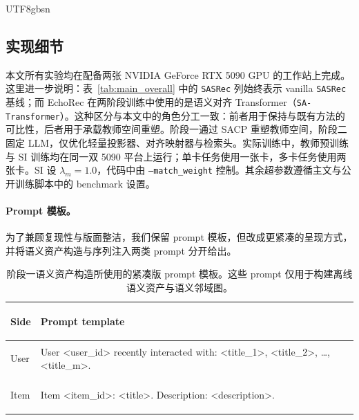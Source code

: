 \documentclass{article}
\begin{document}
\begin{CJK*}{UTF8}{gbsn}
\subsection{实现细节}
\label{app:implementation}

本文所有实验均在配备两张 NVIDIA GeForce RTX 5090 GPU 的工作站上完成。这里进一步说明：表~\ref{tab:main_overall} 中的 \texttt{SASRec} 列始终表示 vanilla \texttt{SASRec} 基线；而 EchoRec 在两阶段训练中使用的是语义对齐 Transformer（\texttt{SA-Transformer}）。这种区分与本文中的角色分工一致：前者用于保持与既有方法的可比性，后者用于承载教师空间重塑。阶段一通过 SACP 重塑教师空间，阶段二固定 LLM，仅优化轻量投影器、对齐映射器与检索头。实际训练中，教师预训练与 SI 训练均在同一双 5090 平台上运行；单卡任务使用一张卡，多卡任务使用两张卡。SI 设 $\lambda_m=1.0$，代码中由 \texttt{--match\_weight} 控制。其余超参数遵循主文与公开训练脚本中的 benchmark 设置。

\paragraph{Prompt 模板。}
为了兼顾复现性与版面整洁，我们保留 prompt 模板，但改成更紧凑的呈现方式，并将语义资产构造与序列注入两类 prompt 分开给出。

\begin{table}[t]
\centering
\caption{阶段一语义资产构造所使用的紧凑版 prompt 模板。这些 prompt 仅用于构建离线语义资产与语义邻域图。}
\label{tab:semantic_asset_prompt_template}
\small
\setlength{\tabcolsep}{6pt}
\renewcommand{\arraystretch}{1.16}
\begin{tabularx}{\textwidth}{>{\bfseries\raggedright\arraybackslash}p{1.15cm} >{\ttfamily\footnotesize\raggedright\arraybackslash}X}
\toprule
Side & Prompt template \\
\midrule
User &
User <user\_id> recently interacted with: <title\_1>, <title\_2>, \ldots, <title\_m>. \\
Item &
Item <item\_id>: <title>. Description: <description>. \\
\bottomrule
\end{tabularx}
\end{table}


\end{CJK*}
\end{document}
